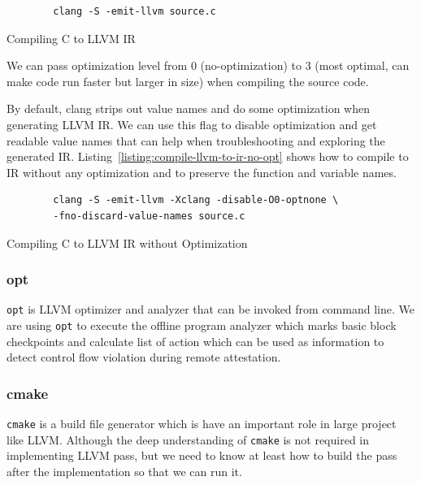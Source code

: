 \begin{listing}[htbp]
    \begin{verbatim}
        clang -S -emit-llvm source.c
    \end{verbatim}
    \caption{Compiling C to LLVM IR}    
    \label{listing:compile-llvm-to-ir}
\end{listing}
    
We can pass optimization level from 0 (no-optimization) to 3 (most optimal, can
make code run faster but larger in size) when compiling the source code.

By default, clang strips out value names and do some optimization when
generating LLVM IR. We can use this flag to disable optimization and get
readable value names that can help when troubleshooting and exploring the
generated IR. Listing~\ref{listing:compile-llvm-to-ir-no-opt} shows how to
compile to IR without any optimization and to preserve the function and variable
names.

\begin{listing}[htbp]
    \begin{verbatim}
        clang -S -emit-llvm -Xclang -disable-O0-optnone \
        -fno-discard-value-names source.c
    \end{verbatim}
    \caption{Compiling C to LLVM IR without Optimization}    
    \label{listing:compile-llvm-to-ir-no-opt}
\end{listing}

\subsubsection{opt}

\texttt{opt} is LLVM optimizer and analyzer that can be invoked from command
line. We are using \texttt{opt} to execute the offline program analyzer which
marks basic block checkpoints and calculate list of action which can be used as
information to detect control flow violation during remote attestation.

\subsubsection{cmake}

\texttt{cmake} is a build file generator which is have an important role in
large project like LLVM. Although the deep understanding of \texttt{cmake} is
not required in implementing LLVM pass, but we need to know at least how to
build the pass after the implementation so that we can run it.

